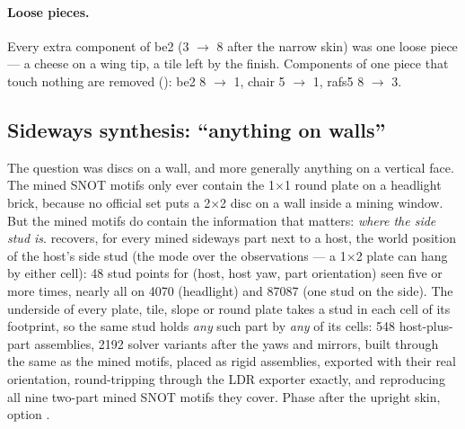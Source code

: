 \paragraph{Loose pieces.} Every extra component of be2 (3 $\to$ 8 after the narrow skin) was one loose piece --- a cheese on a
wing tip, a tile left by the finish. Components of one piece that touch nothing are removed (): be2 8 $\to$ 1,
chair 5 $\to$ 1, rafs5 8 $\to$ 3.

\subsection{Sideways synthesis: ``anything on walls''}
The question was discs on a wall, and more generally anything on a vertical face. The mined SNOT motifs only ever contain the
1$\times$1 round plate on a headlight brick, because no official set puts a 2$\times$2 disc on a wall inside a mining window. But
the mined motifs do contain the information that matters: \emph{where the side stud is}.  recovers, for
every mined sideways part next to a host, the world position of the host's side stud (the mode over the observations --- a
1$\times$2 plate can hang by either cell): 48 stud points for (host, host yaw, part orientation) seen five or more times, nearly
all on 4070 (headlight) and 87087 (one stud on the side). The underside of every plate, tile, slope or round plate takes a stud in
each cell of its footprint, so the same stud holds \emph{any} such part by \emph{any} of its cells: 548 host-plus-part assemblies,
2192 solver variants after the yaws and mirrors, built through the same  as the mined motifs, placed as
rigid assemblies, exported with their real orientation, round-tripping through the LDR exporter exactly, and reproducing all nine
two-part mined SNOT motifs they cover. Phase  after the upright skin, option .

